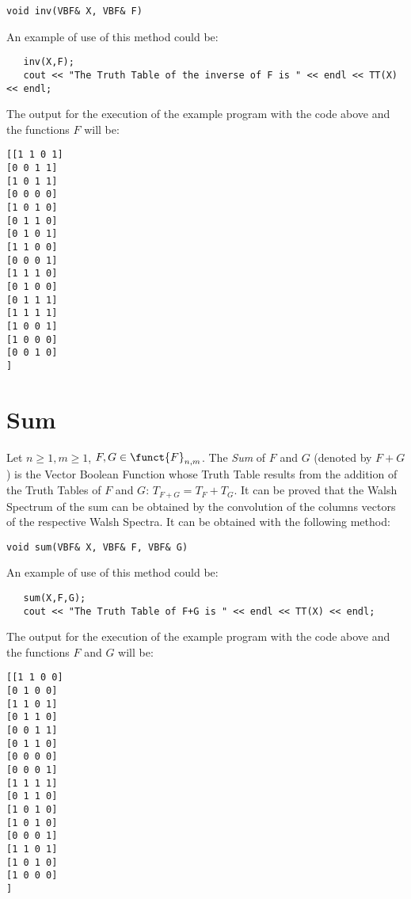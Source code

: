 \begin{verbatim}
void inv(VBF& X, VBF& F)
\end{verbatim}

An example of use of this method could be:

\begin{verbatim}
   inv(X,F);
   cout << "The Truth Table of the inverse of F is " << endl << TT(X) << endl;
\end{verbatim}

The output for the execution of the example program with the code above and the functions $F$ will be:

\begin{verbatim}
[[1 1 0 1]
[0 0 1 1]
[1 0 1 1]
[0 0 0 0]
[1 0 1 0]
[0 1 1 0]
[0 1 0 1]
[1 1 0 0]
[0 0 0 1]
[1 1 1 0]
[0 1 0 0]
[0 1 1 1]
[1 1 1 1]
[1 0 0 1]
[1 0 0 0]
[0 0 1 0]
]
\end{verbatim}

\section{Sum}

Let $n \geq 1, m \geq 1$, $F,G \in \funct{F}_{n,m}$. The \textsl{Sum} of
  $F$ and $G$ (denoted by $F+G$) is the Vector Boolean Function whose Truth
  Table results from the addition of the Truth Tables of $F$ and $G$: $T_{F+G}
  = T_F+T_G$. It can be proved that the Walsh Spectrum of the sum can be obtained
  by the convolution of the columns vectors of the respective Walsh Spectra. It can be obtained with the following method:

\begin{verbatim}
void sum(VBF& X, VBF& F, VBF& G)  
\end{verbatim}

An example of use of this method could be:

\begin{verbatim}
   sum(X,F,G);   
   cout << "The Truth Table of F+G is " << endl << TT(X) << endl;
\end{verbatim}

The output for the execution of the example program with the code above and the functions $F$ and $G$ will be:

\begin{verbatim}
[[1 1 0 0]
[0 1 0 0]
[1 1 0 1]
[0 1 1 0]
[0 0 1 1]
[0 1 1 0]
[0 0 0 0]
[0 0 0 1]
[1 1 1 1]
[0 1 1 0]
[1 0 1 0]
[1 0 1 0]
[0 0 0 1]
[1 1 0 1]
[1 0 1 0]
[1 0 0 0]
]
\end{verbatim}

